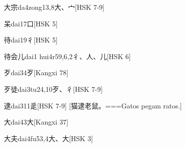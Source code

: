 \begin{EntryWithPhonetic}{大宗}{da4zong1}{3,8}{⼤、⼧}[HSK 7-9]
\end{EntryWithPhonetic}

\begin{EntryWithPhonetic}{呆}{dai1}{7}{⼝}[HSK 5]
\end{EntryWithPhonetic}

\begin{EntryWithPhonetic}{待}{dai1}{9}{⼻}[HSK 5]
\end{EntryWithPhonetic}

\begin{EntryWithPhonetic}{待会儿}{dai1 hui4r5}{9,6,2}{⼻、⼈、⼉}[HSK 6]
\end{EntryWithPhonetic}

\begin{EntryWithPhonetic}{歹}{dai3}{4}{⽍}[Kangxi 78]
\end{EntryWithPhonetic}

\begin{EntryWithPhonetic}{歹徒}{dai3tu2}{4,10}{⽍、⼻}[HSK 7-9]
\end{EntryWithPhonetic}

\begin{EntryWithPhonetic}{逮}{dai3}{11}{⾡}[HSK 7-9]
  [猫逮老鼠。===Gatos pegam ratos.]
\end{EntryWithPhonetic}

\begin{EntryWithPhonetic}{大}{dai4}{3}{⼤}[Kangxi 37]
\end{EntryWithPhonetic}

\begin{EntryWithPhonetic}{大夫}{dai4fu5}{3,4}{⼤、⼤}[HSK 3]
\end{EntryWithPhonetic}

